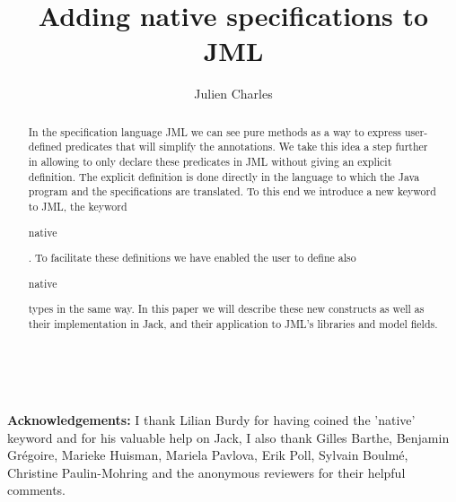 \documentclass{llncs}
\newcommand{\code}[1]{\begin{tt}\begin{small}#1\end{small}\end{tt}}
\begin{document}
%
%
\pagestyle{headings}  %


%
\title{Adding native specifications to JML}

\author{Julien Charles }


\maketitle

\begin{abstract}
In the specification language JML we can see pure methods as a way to 
express user-defined predicates that will simplify the annotations. 
We take this idea a step further in allowing 
to only declare these predicates in JML without giving an explicit definition.
The explicit definition is done directly in the language
to which the Java program and the specifications are 
translated. To this end we introduce a new keyword to JML, the keyword 
\code{native}. 
To facilitate these definitions we have enabled the user to define 
also \code{native} types in the same way.
In this paper we will describe these new constructs as well as their 
implementation in Jack, 
 and their application to JML's libraries and model fields.
\end{abstract}
%







\ \\
\begin{small}
\begin{it}
{\bf Acknowledgements:} I thank Lilian Burdy for having coined the 'native'
 keyword and for his valuable help on Jack, 
I also thank Gilles Barthe, Benjamin Gr\'egoire, Marieke Huisman, 
Mariela Pavlova, Erik Poll,
Sylvain Boulm\'e,  Christine Paulin-Mohring and the anonymous
reviewers for their helpful comments.
\end{it}
\end{small} 


%
%


\end{document}
